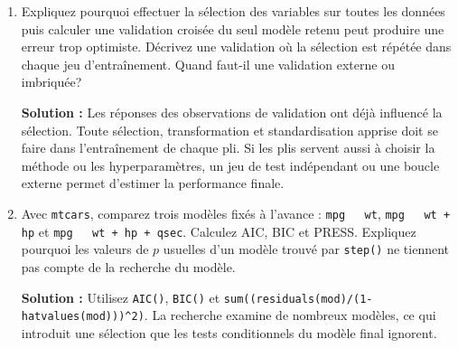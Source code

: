 \documentclass[letterpaper,11pt]{article}
\newcommand{\prof}[1]{\ifdefined\avecsolutions\par{\color{blue}\textbf{Solution :} #1}\par\fi}
\begin{document}
\begin{enumerate}[leftmargin=*,wide,label=\bfseries Exercice \arabic*:]
\item Expliquez pourquoi effectuer la sélection des variables sur toutes les données puis calculer une validation croisée du seul modèle retenu peut produire une erreur trop optimiste. Décrivez une validation où la sélection est répétée dans chaque jeu d'entraînement. Quand faut-il une validation externe ou imbriquée?
\prof{Les réponses des observations de validation ont déjà influencé la sélection. Toute sélection, transformation et standardisation apprise doit se faire dans l'entraînement de chaque pli. Si les plis servent aussi à choisir la méthode ou les hyperparamètres, un jeu de test indépendant ou une boucle externe permet d'estimer la performance finale.}
\item Avec \texttt{mtcars}, comparez trois modèles fixés à l'avance : \texttt{mpg \string~ wt}, \texttt{mpg \string~ wt + hp} et \texttt{mpg \string~ wt + hp + qsec}. Calculez AIC, BIC et PRESS. Expliquez pourquoi les valeurs de $p$ usuelles d'un modèle trouvé par \texttt{step()} ne tiennent pas compte de la recherche du modèle.
\prof{Utilisez \texttt{AIC()}, \texttt{BIC()} et \texttt{sum((residuals(mod)/(1-hatvalues(mod)))\string^2)}. La recherche examine de nombreux modèles, ce qui introduit une sélection que les tests conditionnels du modèle final ignorent.}
\end{enumerate}
\end{document}

